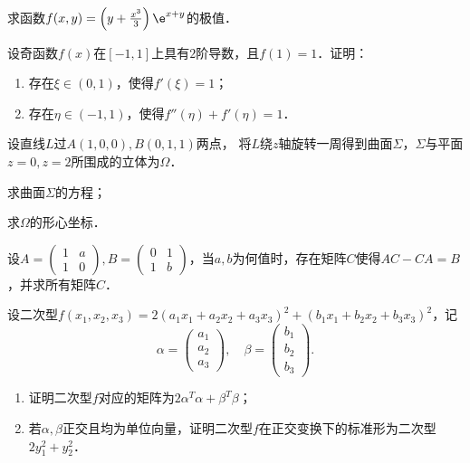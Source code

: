 \documentclass[plain,noanswer,medmath]{../../template/jnuexam}
\begin{document}
\begin{problem}[points=10]
求函数$f(x,y) = \left(y + \frac{x^3}{3} \right) \e^{x + y}$的极值．
\end{problem}


\begin{problem}[points=10]
设奇函数$f(x)$在$[- 1,1]$上具有$2$阶导数，且$f(1) = 1$．证明：
\begin{enumerate}
\item 存在$\xi \in(0,1)$，使得$f'(\xi) = 1$；
\item 存在$\eta \in (-1,1)$，使得$f''(\eta) + f'(\eta) = 1$．
\end{enumerate}
\end{problem}


\begin{problem}[points=10]
设直线$L$过$A(1,0,0),B(0,1,1)$两点，
将$L$绕$z$轴旋转一周得到曲面$\Sigma$，$\Sigma$与平面$z = 0,z = 2$所围成的立体为$\Omega$．\par
\begin{enumerate*}
\item 求曲面$\Sigma$的方程；
\item 求$\Omega$的形心坐标．
\end{enumerate*}
\end{problem}


\begin{problem}[points=11]
设$A = \begin{pmatrix}
  1 & a \\
  1 & 0
\end{pmatrix},B = \begin{pmatrix}
  0 & 1 \\
  1 & b
\end{pmatrix}$，当$a,b$为何值时，存在矩阵$C$使得$AC - CA = B$，并求所有矩阵$C$．
\end{problem}


\begin{problem}[points=11]
设二次型$f(x_1,x_2,x_3) = 2(a_1x_1 + a_2x_2 + a_3x_3)^2 + (b_1x_1 + b_2x_2 + b_3x_3)^2$，记
$$\alpha = \begin{pmatrix}
  a_1 \\
  a_2 \\
  a_3
\end{pmatrix},\quad\beta = \begin{pmatrix}
  b_1 \\
  b_2 \\
  b_3
\end{pmatrix}.$$
\begin{enumerate}
\item 证明二次型$f$对应的矩阵为$2\alpha^T\alpha + \beta^T\beta$；
\item 若$\alpha ,\beta$正交且均为单位向量，证明二次型$f$在正交变换下的标准形为二次型$2y_1^2 + y_2^2$．
\end{enumerate}
\end{problem}
\end{document}
